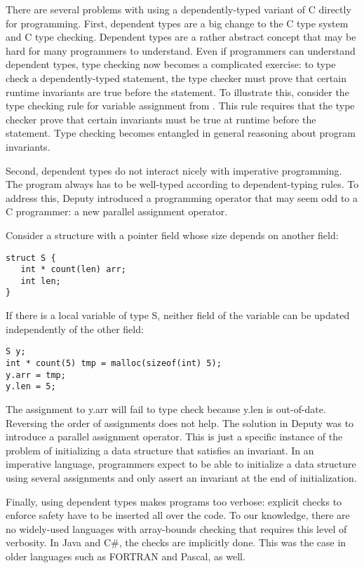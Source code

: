 There are several problems with using a dependently-typed variant of C
directly for programming. First, dependent types are a big change to the
C type system and C type checking. Dependent types are a rather abstract
concept that may be hard for many programmers to understand. Even if
programmers can understand dependent types, type checking now becomes a
complicated exercise: to type check a dependently-typed statement, the
type checker must prove that certain runtime invariants are true before
the statement. To illustrate this, consider the type checking rule for
variable assignment from \cite{Condit2007}. This
rule requires that the type checker prove that certain invariants must
be true at runtime before the statement. Type checking becomes entangled
in general reasoning about program invariants.

Second, dependent types do not interact nicely with imperative
programming. The program always has to be well-typed according to
dependent-typing rules. To address this, Deputy introduced a programming
operator that may seem odd to a C programmer: a new parallel assignment
operator.

Consider a structure with a pointer field whose size depends on another
field:
\begin{verbatim}
struct S {
   int * count(len) arr;
   int len;
}
\end{verbatim}

If there is a local variable of type S, neither field of the variable
can be updated independently of the other field:

\begin{verbatim}
S y;
int * count(5) tmp = malloc(sizeof(int) 5);
y.arr = tmp;
y.len = 5;
\end{verbatim}

The assignment to y.arr will fail to type check because y.len is
out-of-date. Reversing the order of assignments does not help. The
solution in Deputy was to introduce a parallel assignment operator. This
is just a specific instance of the problem of initializing a data
structure that satisfies an invariant. In an imperative language,
programmers expect to be able to initialize a data structure using
several assignments and only assert an invariant at the end of
initialization.

Finally, using dependent types makes programs too verbose: explicit
checks to enforce safety have to be inserted all over the code. To our
knowledge, there are no widely-used languages with array-bounds checking
that requires this level of verbosity. In Java and C\#, the checks are
implicitly done. This was the case in older languages such as FORTRAN
and Pascal, as well.

